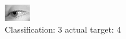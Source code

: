 \begin{figure}[h!]
\begin{center}
\includegraphics[width=0.60\columnwidth]{figures/ID2950_class_3_target_4.png}
\end{center}
\caption{ Classification: 3 actual target: 4}
\label{fig:ID2950_class_3_target_4}
\end{figure}
